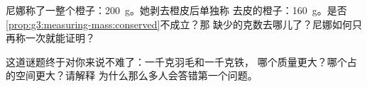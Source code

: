 \begin{exercise}[$\star\star$]\label{exo:g3:measuring-mass:10}
尼娜称了一整个橙子：\qty{200}{g}。她剥去橙皮后单独称
去皮的橙子：\qty{160}{g}。是否
\cref{prop:g3:measuring-mass:conserved}不成立？那
缺少的克数去哪儿了？尼娜如何只再称一次就能证明？
\end{exercise}

\begin{exercise}[$\star\star$]\label{exo:g3:measuring-mass:11}
这道谜题终于对你来说不难了：一千克羽毛和一千克铁，
哪个质量更大？哪个占的空间更大？请解释
为什么那么多人会答错第一个问题。
\end{exercise}

